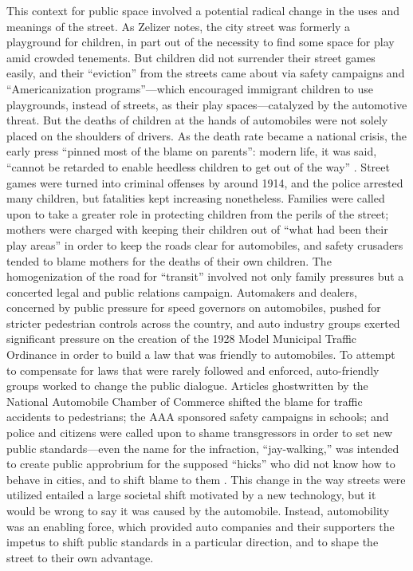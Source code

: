 This context for public space involved a potential radical change in
the uses and meanings of the street. As Zelizer notes, the city street
was formerly a playground for children, in part out of the necessity
to find some space for play amid crowded tenements\cite[p.
  33]{???-zelizer}. But children did not surrender their street games
easily, and their ``eviction'' from the streets came about via safety
campaigns and ``Americanization programs''---which encouraged
immigrant children to use playgrounds, instead of streets, as their
play spaces---catalyzed by the automotive threat\cite[p.
  35]{???-zelizer}. But the deaths of children at the hands of
automobiles were not solely placed on the shoulders of drivers. As the
death rate became a national crisis, the
early press ``pinned most of the blame on parents'': modern life, it
was said, ``cannot be retarded to enable heedless children to get out
of the way'' \cite[p. 37]{???-zelizer}. Street games were turned into
criminal offenses by around 1914, and the police arrested many
children, but fatalities kept increasing nonetheless\cite[p.
  38]{???-zelizer}. Families were called upon to take a greater role
in protecting children from the perils of the street; mothers were
charged with keeping their children out of ``what had been their play
areas'' in order to keep the roads clear for automobiles, and safety
crusaders tended to blame mothers for the deaths of their own
children\cite[p. 13]{???-lochlannjain}. The homogenization of the road
for ``transit'' \cite[p. 13]{???_lochlannjain} involved not only
family pressures but a concerted legal and public relations campaign. Automakers
and dealers, concerned by public pressure for speed governors on
automobiles, pushed for stricter pedestrian controls across the country, and
auto industry groups exerted significant pressure on the creation of
the 1928 Model Municipal Traffic Ordinance in order to build a law
that was friendly to automobiles\cite{???-vox}. To attempt to
compensate for laws that were rarely followed and enforced,
auto-friendly groups worked to change the public dialogue. Articles
ghostwritten by the National Automobile Chamber of Commerce shifted
the blame for traffic accidents to pedestrians; the AAA sponsored
safety campaigns in schools; and police and citizens were called upon
to shame transgressors in order to set new public standards---even the
name for the infraction, ``jay-walking,'' was intended to create
public approbrium for the supposed ``hicks'' who did not know how to
behave in cities, and to shift blame to them \cite{???-vox}. This
change in the way streets were utilized entailed a large societal
shift motivated by a new technology, but it would be wrong to say it
was caused by the automobile. Instead, automobility was an enabling
force, which provided auto companies and their supporters the impetus
to shift public standards in a particular direction, and to shape the
street to their own advantage.

